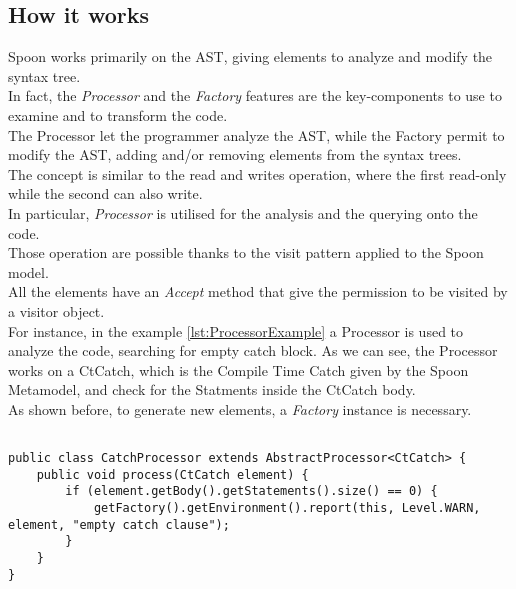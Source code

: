 \subsection*{How it works}\label{subsec:howSpoon}
Spoon works primarily on the AST, giving elements to analyze and modify the syntax tree.\\
In fact, the \emph{Processor} and the \emph{Factory} features are the key-components to use to examine and to transform the code.\\
The Processor let the programmer analyze the AST, while the Factory permit to modify the AST, adding and/or removing elements from the syntax trees.\\
The concept is similar to the read and writes operation, where the first read-only while the second can also write.\\
In particular, \emph{Processor} is utilised for the analysis and the querying onto the code.\\
Those operation are possible thanks to the visit pattern applied to the Spoon model.\\
All the elements have an \emph{Accept} method that give the permission to be visited by a visitor object.\\
For instance, in the example \ref{lst:ProcessorExample} a Processor is used to analyze the code, searching for empty catch block.
As we can see, the Processor works on a CtCatch, which is the Compile Time Catch given by the Spoon Metamodel, and check for the Statments inside the CtCatch body. \\
As shown before, to generate new elements, a \emph{Factory} instance is necessary.\\
\begin{lstlisting}[caption={Processor example taken from \href{http://spoon.gforge.inria.fr/processor.html}{Spoon documentation}},label={lst:ProcessorExample}]% Start your code-block

public class CatchProcessor extends AbstractProcessor<CtCatch> {
	public void process(CtCatch element) {
		if (element.getBody().getStatements().size() == 0) {
			getFactory().getEnvironment().report(this, Level.WARN, element, "empty catch clause");
		}
	}
}
\end{lstlisting}

